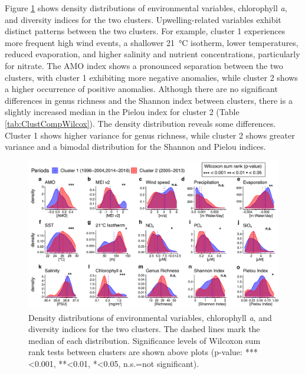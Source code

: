\documentclass[draft]{agujournal2019}
\begin{document}
Figure \ref{fig:clustcomp} shows density distributions of environmental variables, chlorophyll \textit{a}, and diversity indices for the two clusters. Upwelling-related variables exhibit distinct patterns between the two clusters. For example, cluster 1 experiences more frequent high wind events, a shallower \qty{21}{\celsius} isotherm, lower temperatures, reduced evaporation, and higher salinity and nutrient concentrations, particularly for nitrate. The AMO index shows a pronounced separation between the two clusters, with cluster 1 exhibiting more negative anomalies, while cluster 2 shows a higher occurrence of positive anomalies. Although there are no significant differences in genus richness and the Shannon index between clusters, there is a slightly increased median in the Pielou index for cluster 2 (Table \ref{tab:ClustCompWilcox}). The density distribution reveals some differences. Cluster 1 shows higher variance for genus richness, while cluster 2 shows greater variance and a bimodal distribution for the Shannon and Pielou indices. 

\begin{figure}
\noindent\includegraphics[width=\textwidth]{fig/Figure5_ClustCompPlot_v2.pdf}
\caption{Density distributions of environmental variables, chlorophyll \textit{a}, and diversity indices for the two clusters. The dashed lines mark the median of each distribution. Significance levels of Wilcoxon sum rank tests between clusters are shown above plots  (p-value: ***\textless0.001, **\textless0.01, *\textless0.05, n.s.=not significant).}
\label{fig:clustcomp}
\end{figure}
\end{document}
